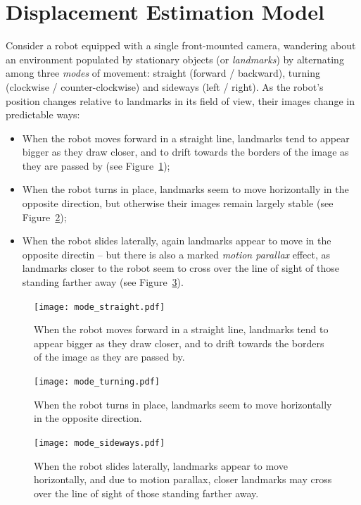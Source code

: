 \documentclass[twocolumn, 9pt]{jsproceedings}
\begin{document}
\section{Displacement Estimation Model}

Consider a robot equipped with a single front-mounted camera, wandering about an environment populated by stationary objects (or {\it landmarks}) by alternating among three {\it modes} of movement: straight (forward / backward), turning (clockwise / counter-clockwise) and sideways (left / right). As the robot's position changes relative to landmarks in its field of view, their images change in predictable ways:

\begin{itemize}
\item When the robot moves forward in a straight line, landmarks tend to appear bigger as they draw closer, and to drift towards the borders of the image as they are passed by (see Figure~\ref{fig:mode_straight});
\item When the robot turns in place, landmarks seem to move horizontally in the opposite direction, but otherwise their images remain largely stable (see Figure~\ref{fig:mode_turning});
\item When the robot slides laterally, again landmarks appear to move in the opposite directin -- but there is also a marked {\it motion parallax} effect, as landmarks closer to the robot seem to cross over the line of sight of those standing farther away (see Figure~\ref{fig:mode_sideways}).
\end{itemize}

\begin{figure}[h!]
\texttt{[image: mode\_straight.pdf]}
\caption{When the robot moves forward in a straight line, landmarks tend to appear bigger as they draw closer, and to drift towards the borders of the image as they are passed by.}
\label{fig:mode_straight}
\end{figure}

\begin{figure}[h!]
\texttt{[image: mode\_turning.pdf]}
\caption{When the robot turns in place, landmarks seem to move horizontally in the opposite direction.}
\label{fig:mode_turning}
\end{figure}

\begin{figure}[h!]
\texttt{[image: mode\_sideways.pdf]}
\caption{When the robot slides laterally, landmarks appear to move horizontally, and due to motion parallax, closer landmarks may cross over the line of sight of those standing farther away.}
\label{fig:mode_sideways}
\end{figure}
\end{document}
